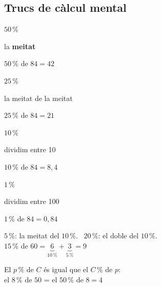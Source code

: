 \documentclass[11pt,a4paper]{article}
\newcommand{\heavy}{\fontseries{eb}\selectfont}
\newcommand{\pc}{\,\%}
\begin{document}
\vfill
\subsection{Trucs de càlcul mental}
\begin{tcbraster}[raster columns=4,raster equal height,raster column skip=8pt]
\begin{tcolorbox}[fmbase,colback=fmdefbg,colframe=fmdef,before upper=\centering,top=2mm,bottom=2mm]
{\Large\heavy\color{fmblue}$50\pc$}\par la \textbf{meitat}\par{\small$50\pc$ de $84=42$}
\end{tcolorbox}
\begin{tcolorbox}[fmbase,colback=fmdefbg,colframe=fmdef,before upper=\centering,top=2mm,bottom=2mm]
{\Large\heavy\color{fmblue}$25\pc$}\par la meitat de la meitat\par{\small$25\pc$ de $84=21$}
\end{tcolorbox}
\begin{tcolorbox}[fmbase,colback=fmdefbg,colframe=fmdef,before upper=\centering,top=2mm,bottom=2mm]
{\Large\heavy\color{fmblue}$10\pc$}\par dividim entre 10\par{\small$10\pc$ de $84=8{,}4$}
\end{tcolorbox}
\begin{tcolorbox}[fmbase,colback=fmdefbg,colframe=fmdef,before upper=\centering,top=2mm,bottom=2mm]
{\Large\heavy\color{fmblue}$1\pc$}\par dividim entre 100\par{\small$1\pc$ de $84=0{,}84$}
\end{tcolorbox}
\end{tcbraster}

\vfill
\begin{minipage}[t]{0.5\linewidth}
\begin{truc}[Combina'ls]
$5\pc$: la meitat del $10\pc$. \ $20\pc$: el doble del $10\pc$.\\[4pt]
$15\pc$ de $60=\underbrace{6}_{10\pc}+\underbrace{3}_{5\pc}=9$
\end{truc}
\end{minipage}\hfill
\begin{minipage}[t]{0.47\linewidth}
\begin{truc}
El $p\pc$ de $C$ és igual que el $C\pc$ de $p$:\\[4pt]
el $8\pc$ de $50$ = el $50\pc$ de $8=\boxed{4}$
\end{truc}
\end{minipage}
\end{document}
